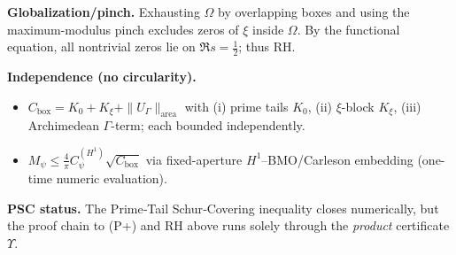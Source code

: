 \documentclass[10pt]{article}
\begin{document}
\textbf{Globalization/pinch.} Exhausting $\Omega$ by overlapping boxes and using the maximum-modulus pinch excludes zeros of $\xi$ inside $\Omega$. By the functional equation, all nontrivial zeros lie on $\Re s=\tfrac12$; thus RH.

\textbf{Independence (no circularity).}
\begin{itemize}
  \item $C_{\mathrm{box}}=K_0+K_\xi+\|U_\Gamma\|_{\mathrm{area}}$ with (i) prime tails $K_0$, (ii) $\xi$-block $K_\xi$, (iii) Archimedean $\Gamma$-term; each bounded independently.
  \item $M_\psi\le \tfrac{4}{\pi}C_\psi^{(H^1)}\sqrt{C_{\mathrm{box}}}$ via fixed-aperture $H^1$–BMO/Carleson embedding (one-time numeric evaluation).
\end{itemize}

\textbf{PSC status.} The Prime‑Tail Schur‑Covering inequality closes numerically, but the proof chain to (P+) and RH above runs solely through the \emph{product} certificate $\Upsilon$.
\end{document}
